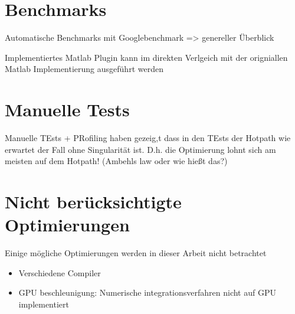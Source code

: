 \section{Benchmarks}

Automatische Benchmarks mit Googlebenchmark => genereller Überblick

Implementiertes Matlab Plugin kann im direkten Verlgeich mit der origniallen Matlab Implementierung ausgeführt werden


\section{Manuelle Tests}

Manuelle TEsts + PRofiling haben gezeig,t dass in den TEsts der Hotpath wie erwartet der Fall ohne Singularität ist.
D.h. die Optimierung lohnt sich am meisten auf dem Hotpath! (Ambehls law oder wie hießt das?)

\section{Nicht berücksichtigte Optimierungen}

Einige mögliche Optimierungen werden in dieser Arbeit nicht betrachtet

\begin{itemize}
    \item Verschiedene Compiler
    \item GPU beschleunigung: Numerische integrationsverfahren nicht auf GPU implementiert
\end{itemize}


